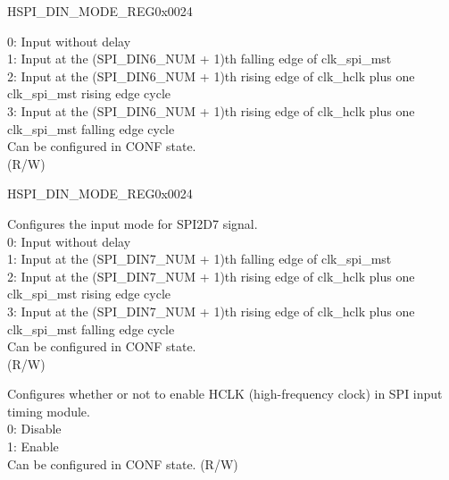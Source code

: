 \begin{register}{H}{SPI\_DIN\_MODE\_REG}{0x0024}
\begin{regdesc}
\begin{reglist}
0: Input without delay\\
1: Input at the (SPI\_DIN6\_NUM + 1)th falling edge of clk\_spi\_mst\\
2: Input at the (SPI\_DIN6\_NUM + 1)th rising edge of clk\_hclk plus one clk\_spi\_mst rising edge cycle\\
3: Input at the (SPI\_DIN6\_NUM + 1)th rising edge of clk\_hclk plus one clk\_spi\_mst falling edge cycle\\
Can be configured in CONF state. \\
(R/W)
\item [Continued on the next page...]
\end{reglist}\end{regdesc}
\end{register}

\addtocounter{Regfloat}{-1}
\begin{register}{H}{SPI\_DIN\_MODE\_REG}{0x0024}
\begin{regdesc}\begin{reglist}
\item [Continued from the previous page...]
\label{fielddesc:SPIDIN7MODE}\item [SPI\_DIN7\_MODE] Configures the input mode for SPI2D7 signal.\\
0: Input without delay\\
1: Input at the (SPI\_DIN7\_NUM + 1)th falling edge of clk\_spi\_mst\\
2: Input at the (SPI\_DIN7\_NUM + 1)th rising edge of clk\_hclk plus one clk\_spi\_mst rising edge cycle\\
3: Input at the (SPI\_DIN7\_NUM + 1)th rising edge of clk\_hclk plus one clk\_spi\_mst falling edge cycle\\
Can be configured in CONF state. \\
(R/W)
\label{fielddesc:SPITIMINGHCLKACTIVE}\item [SPI\_TIMING\_HCLK\_ACTIVE] Configures whether or not to enable HCLK (high-frequency clock) in SPI input timing module.\\
0: Disable\\
1: Enable\\
Can be configured in CONF state. (R/W)
\end{reglist}\end{regdesc}
\end{register}


